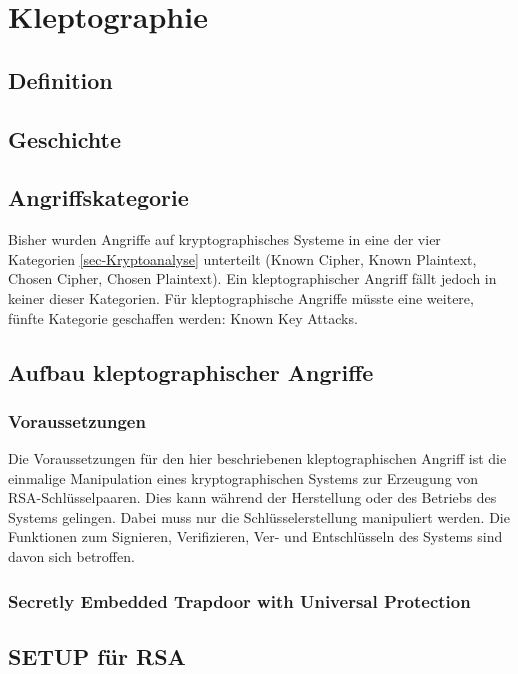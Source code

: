 \chapter{Kleptographie}
    \section{Definition}


    \section{Geschichte}

    \section{Angriffskategorie}
        Bisher wurden Angriffe auf kryptographisches Systeme in eine der vier Kategorien \ref{sec-Kryptoanalyse} unterteilt (Known Cipher, Known Plaintext, Chosen Cipher, Chosen Plaintext). Ein kleptographischer Angriff fällt jedoch in keiner dieser Kategorien. Für kleptographische Angriffe müsste eine weitere, fünfte Kategorie geschaffen werden: Known Key Attacks. 

    \section{Aufbau kleptographischer Angriffe}
    

        \subsection{Voraussetzungen} 
        Die Voraussetzungen für den hier beschriebenen kleptographischen Angriff ist die einmalige Manipulation eines kryptographischen Systems zur Erzeugung von \ac{RSA}-Schlüsselpaaren. Dies kann während der Herstellung oder des Betriebs des Systems gelingen. Dabei muss nur die Schlüsselerstellung manipuliert werden. Die Funktionen zum Signieren, Verifizieren, Ver- und Entschlüsseln des Systems sind davon sich betroffen.


        \subsection{Secretly Embedded Trapdoor with Universal Protection}

    \section{SETUP für RSA}
